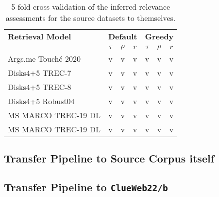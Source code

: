 \begin{table}[h!]
    \centering
    \caption{5-fold cross-validation of the inferred relevance assessments for the source datasets to themselves.}
    \begin{tabular}{lcccccc}
        \toprule
        \textbf{Retrieval Model} & \multicolumn{3}{c}{\textbf{Default}} & \multicolumn{3}{c}{\textbf{Greedy}} \\
        \cmidrule(lr){2-4} \cmidrule(lr){5-7}
                                 & $\tau$ & $\rho$ & $r$ & $\tau$ & $\rho$ & $r$ \\
        \midrule

        Args.me Touché 2020 & v & v & v & v & v & v \\
        Disks4+5 TREC-7     & v & v & v & v & v & v \\
        Disks4+5 TREC-8     & v & v & v & v & v & v \\
        Disks4+5 Robust04   & v & v & v & v & v & v \\
        MS MARCO TREC-19 DL & v & v & v & v & v & v \\
        MS MARCO TREC-19 DL & v & v & v & v & v & v \\
        
        \bottomrule
    \end{tabular}
\end{table}

\subsection{Transfer Pipeline to Source Corpus itself}\label{eval-pairwise-preferences-source}

\subsection{Transfer Pipeline to \texttt{ClueWeb22/b}}\label{eval-pairwise-preferences-target}